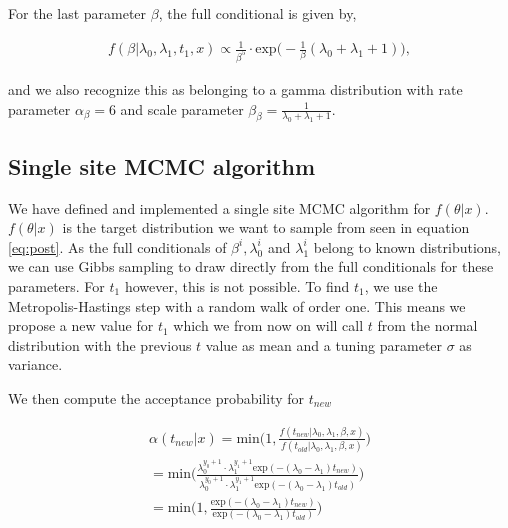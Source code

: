 For the last parameter $\beta$, the full conditional is given by,

\begin{align}
    f(\beta | \lambda_0, \lambda_1, t_1, x) \propto 
    \frac{1}{\beta^5} \cdot \text{exp} \Big( -\frac{1}{\beta}(\lambda_0 + \lambda_1 + 1) \Big),
\end{align}

and we also recognize this as belonging to a gamma distribution with rate parameter $\alpha_{\beta} = 6$ and scale parameter $\beta_{\beta} = \frac{1}{\lambda_0 + \lambda_1 + 1} $. 

\subsection{Single site MCMC algorithm}

We have defined and implemented a single site MCMC algorithm for $f(\theta |x)$. $f(\theta|x)$ is the target distribution we want to sample from seen in equation \ref{eq:post}.  As the full conditionals of $\beta^i, \lambda_0^i$ and $\lambda_1^i$ belong to known distributions, we can use Gibbs sampling to draw directly from the full conditionals for these parameters. For $t_1$ however, this is not possible.
To find $t_1$, we use the Metropolis-Hastings step with a random walk of order one. This means we propose a new value for $t_1$ which we from now on will call $t$ from the normal distribution with the previous $t$ value as mean and a tuning parameter $\sigma$ as variance. 


We then compute the acceptance probability for $t_{new}$

\begin{align}
    \alpha(t_{new}|x) = \text{min} \Big( 1, \frac{f(t_{new}| \lambda_0, \lambda_1, \beta, x)}{f(t_{old}| \lambda_0, \lambda_1, \beta, x)} \Big) \nonumber \\ 
    = \text{min} \Big( \frac{\lambda_0^{y_0 + 1} \cdot \lambda_1^{y_1 + 1} \text{exp}(-(\lambda_0 - \lambda_1)t_{new})}{\lambda_0^{y_0 + 1} \cdot \lambda_1^{y_1 + 1} \text{exp}(-(\lambda_0 - \lambda_1)t_{old})} \Big) \nonumber \\
    = \text{min} \Big( 1, \frac{\text{exp}(-(\lambda_0 - \lambda_1)t_{new})}{\text{exp}(-(\lambda_0 - \lambda_1)t_{old})} \Big)
\end{align}

